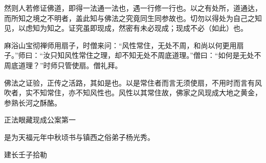 然则人若修证佛道，即得一法通一法也，遇一行修一行也。以之有处所，道通达，而所知之境之不明者，盖此知与佛法之究竟同生同参故也。切勿以得处为自己之知见，以虑知为知之。证究虽即现成，然密有未必现成；现成不必（如此）也。

麻浴山宝彻禅师用扇子，时僧来问：“风性常住，无处不周，和尚以何更用扇子。”师曰：“汝只知风性常住之理，却不知无处不周底道理。”僧曰：“如何是无处不周底道理？”时师只管使扇。僧礼拜。

佛法之证验，正传之活路，其如是也。以是常住者而言无须使扇，不用时而言有风吹者，实不知常住，亦不知风性也。风性以其常住故，佛家之风现成大地之黄金，参熟长河之酥酪。

\vskip 2pc
正法眼藏现成公案第一

是为天福元年中秋顷书与镇西之俗弟子杨光秀。

建长壬子拾勒

\endchapter
